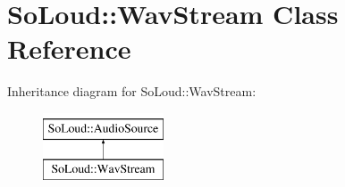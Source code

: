 \hypertarget{class_so_loud_1_1_wav_stream}{}\section{So\+Loud\+::Wav\+Stream Class Reference}
\label{class_so_loud_1_1_wav_stream}
Inheritance diagram for So\+Loud\+::Wav\+Stream\+:\begin{figure}[H]
\begin{center}
\leavevmode
\includegraphics[height=2.000000cm]{class_so_loud_1_1_wav_stream}
\end{center}
\end{figure}
